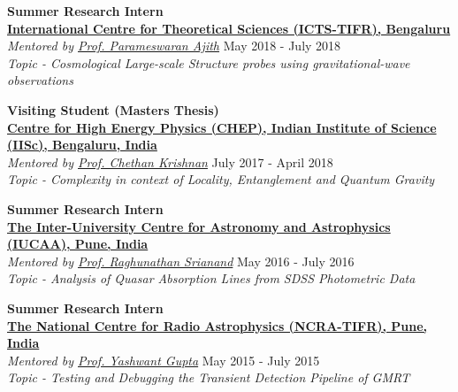 \documentclass[margin, centered]{res}
\begin{document}
\begin{resume}
\textbf{Summer Research Intern}
\\
\textbf{\href{https://www.icts.res.in/}{International Centre for Theoretical Sciences (ICTS-TIFR), Bengaluru}}\\
\emph{Mentored by \href{https://home.icts.res.in/~ajith/Home.html}{Prof. Parameswaran Ajith}} \hfill May 2018 - July 2018\\
\textit{Topic - Cosmological Large-scale Structure probes using gravitational-wave observations}

\textbf{Visiting Student (Masters Thesis)}
\\
\textbf{\href{http://chep.iisc.ac.in/}{Centre for High Energy Physics (CHEP), Indian Institute of Science (IISc), Bengaluru, India}}\\
\emph{Mentored by \href{http://chep.iisc.ac.in/Personnel/pages/chethan/index.html}{Prof. Chethan Krishnan}} \hfill July 2017 - April 2018\\
\textit{Topic - Complexity in context of Locality, Entanglement and Quantum Gravity}

\textbf{Summer Research Intern}
\\
\textbf{\href{http://www.iucaa.ernet.in/}{The Inter-University Centre for Astronomy and Astrophysics (IUCAA), Pune, India}}
\\
\emph{Mentored by \href{http://www.iucaa.ernet.in/~anand/}{Prof. Raghunathan Srianand}} \hfill May 2016 - July 2016\\
\textit{Topic - Analysis of Quasar Absorption Lines from SDSS Photometric Data}

\textbf{Summer Research Intern}\\
\textbf{\href{http://www.ncra.tifr.res.in/}{The National Centre for Radio Astrophysics (NCRA-TIFR), Pune, India}}\\
\emph{Mentored by \href{http://www.ncra.tifr.res.in/ncra/people/academic/ncra-faculty/Yashwant_Gupta}{Prof. Yashwant Gupta}} \hfill May 2015 - July 2015\\
\textit{Topic - Testing and Debugging the Transient Detection Pipeline of GMRT}




\end{resume}
\end{document}
